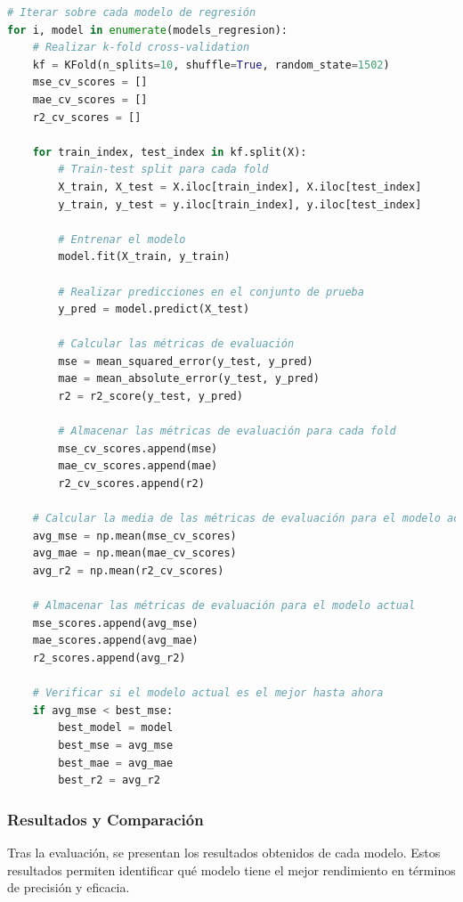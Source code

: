 \begin{lstlisting}[language=Python, caption=Codigo de evaluacion de modelos, label=lst:cod_Eval]
# Iterar sobre cada modelo de regresión
for i, model in enumerate(models_regresion):
    # Realizar k-fold cross-validation
    kf = KFold(n_splits=10, shuffle=True, random_state=1502)
    mse_cv_scores = []
    mae_cv_scores = []
    r2_cv_scores = []
    
    for train_index, test_index in kf.split(X):
        # Train-test split para cada fold
        X_train, X_test = X.iloc[train_index], X.iloc[test_index]
        y_train, y_test = y.iloc[train_index], y.iloc[test_index]
        
        # Entrenar el modelo
        model.fit(X_train, y_train)
        
        # Realizar predicciones en el conjunto de prueba
        y_pred = model.predict(X_test)
        
        # Calcular las métricas de evaluación
        mse = mean_squared_error(y_test, y_pred)
        mae = mean_absolute_error(y_test, y_pred)
        r2 = r2_score(y_test, y_pred)
        
        # Almacenar las métricas de evaluación para cada fold
        mse_cv_scores.append(mse)
        mae_cv_scores.append(mae)
        r2_cv_scores.append(r2)
        
    # Calcular la media de las métricas de evaluación para el modelo actual
    avg_mse = np.mean(mse_cv_scores)
    avg_mae = np.mean(mae_cv_scores)
    avg_r2 = np.mean(r2_cv_scores)
    
    # Almacenar las métricas de evaluación para el modelo actual
    mse_scores.append(avg_mse)
    mae_scores.append(avg_mae)
    r2_scores.append(avg_r2)
    
    # Verificar si el modelo actual es el mejor hasta ahora
    if avg_mse < best_mse:
        best_model = model
        best_mse = avg_mse
        best_mae = avg_mae
        best_r2 = avg_r2
    \end{lstlisting}


\subsubsection{Resultados y Comparación}
Tras la evaluación, se presentan los resultados obtenidos de cada modelo. Estos resultados permiten identificar qué modelo tiene el mejor rendimiento en términos de precisión y eficacia.

